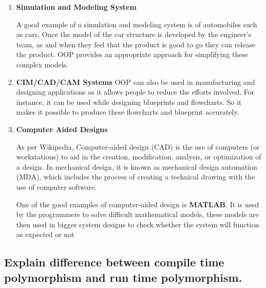 \documentclass[11pt]{article}
\begin{document}
\begin{enumerate}
	
	\item \textbf{Simulation and Modeling System }

	A good example of a simulation and modeling system is of automobiles such as cars, Once the model of the car structure is developed by the engineer’s team, as and when they feel that the product is good to go they can release the product.  OOP provides an appropriate approach for simplifying these complex models.
	
	\item \textbf{CIM/CAD/CAM Systems }
	 OOP can also be used in manufacturing and designing applications as it allows people to reduce the efforts involved. For instance, it can be used while designing blueprints and flowcharts. So it makes it possible to produce these flowcharts and blueprint accurately.
	
	\item \textbf{Computer Aided Designs }
	
	As per Wikipedia, Computer-aided design (CAD) is the use of computers (or workstations) to aid in the creation, modification, analysis, or optimization of a design. In mechanical design, it is known as mechanical design automation (MDA), which includes the process of creating a technical drawing with the use of computer software.
	
	One of the good examples of computer-aided design is \textbf{MATLAB}. It is used by the programmers to solve difficult mathematical models, these models are then used in bigger system designs to check whether the system will function as expected or not
\end{enumerate}

\subsection{Explain difference between compile time polymorphism and run time polymorphism.}
\end{document}
